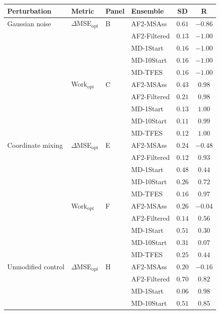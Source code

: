 \begin{table}[htbp]
    \centering
    \small
    \begin{tabular}{@{}llllcc@{}}
    \toprule
        \textbf{Perturbation} & \textbf{Metric} & \textbf{Panel} & \textbf{Ensemble} & \textbf{SD} & \textbf{R} \\
        \midrule
        Gaussian noise & $\Delta$MSE$_{\text{opt}}$ & B & AF2-MSAss & $0.61$ & $-0.86$ \\
        & & & AF2-Filtered & $0.13$ & $-1.00$ \\
        & & & MD-1Start & $0.16$ & $-1.00$ \\
        & & & MD-10Start & $0.16$ & $-1.00$ \\
        & & & MD-TFES & $0.16$ & $-1.00$ \\
        \midrule
        & Work$_{\text{opt}}$ & C & AF2-MSAss & $0.43$ & $0.98$ \\
        & & & AF2-Filtered & $0.21$ & $0.98$ \\
        & & & MD-1Start & $0.13$ & $1.00$ \\
        & & & MD-10Start & $0.11$ & $0.99$ \\
        & & & MD-TFES & $0.12$ & $1.00$ \\
        \midrule
        Coordinate mixing & $\Delta$MSE$_{\text{opt}}$ & E & AF2-MSAss & $0.24$ & $-0.48$ \\
        & & & AF2-Filtered & $0.12$ & $0.93$ \\
        & & & MD-1Start & $0.48$ & $0.44$ \\
        & & & MD-10Start & $0.26$ & $0.72$ \\
        & & & MD-TFES & $0.16$ & $0.97$ \\
        \midrule
        & Work$_{\text{opt}}$ & F & AF2-MSAss & $0.26$ & $-0.04$ \\
        & & & AF2-Filtered & $0.14$ & $0.56$ \\
        & & & MD-1Start & $0.51$ & $0.30$ \\
        & & & MD-10Start & $0.31$ & $0.07$ \\
        & & & MD-TFES & $0.25$ & $0.44$ \\
        \midrule
        Unmodified control & $\Delta$MSE$_{\text{opt}}$ & H & AF2-MSAss & $0.20$ & $-0.16$ \\
        & & & AF2-Filtered & $0.70$ & $0.82$ \\
        & & & MD-1Start & $0.06$ & $0.98$ \\
        & & & MD-10Start & $0.51$ & $0.85$ \\

\end{tabular}
\end{table}
